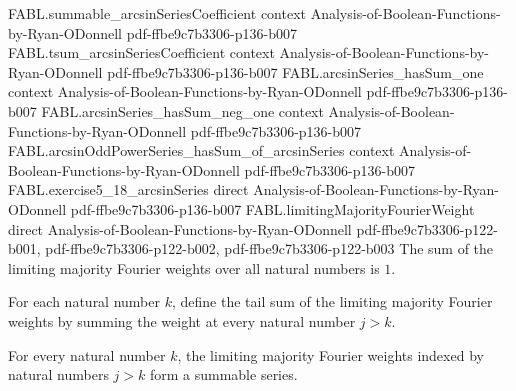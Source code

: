 \begin{theorem}
  {FABL.summable_arcsinSeriesCoefficient}
  {context}
  {Analysis-of-Boolean-Functions-by-Ryan-ODonnell}
  {pdf-ffbe9c7b3306-p136-b007}
\proofstep
  {FABL.tsum_arcsinSeriesCoefficient}
  {context}
  {Analysis-of-Boolean-Functions-by-Ryan-ODonnell}
  {pdf-ffbe9c7b3306-p136-b007}
\proofstep
  {FABL.arcsinSeries_hasSum_one}
  {context}
  {Analysis-of-Boolean-Functions-by-Ryan-ODonnell}
  {pdf-ffbe9c7b3306-p136-b007}
\proofstep
  {FABL.arcsinSeries_hasSum_neg_one}
  {context}
  {Analysis-of-Boolean-Functions-by-Ryan-ODonnell}
  {pdf-ffbe9c7b3306-p136-b007}
\proofstep
  {FABL.arcsinOddPowerSeries_hasSum_of_arcsinSeries}
  {context}
  {Analysis-of-Boolean-Functions-by-Ryan-ODonnell}
  {pdf-ffbe9c7b3306-p136-b007}
\proofstep
  {FABL.exercise5_18_arcsinSeries}
  {direct}
  {Analysis-of-Boolean-Functions-by-Ryan-ODonnell}
  {pdf-ffbe9c7b3306-p136-b007}
\proofstep
  {FABL.limitingMajorityFourierWeight}
  {direct}
  {Analysis-of-Boolean-Functions-by-Ryan-ODonnell}
  {pdf-ffbe9c7b3306-p122-b001,
    pdf-ffbe9c7b3306-p122-b002,
    pdf-ffbe9c7b3306-p122-b003}
The sum of the limiting majority Fourier weights over all natural numbers is $1$.
\end{theorem}

\begin{definition}
\label{FABL.limitingMajorityFourierWeightAbove}
\leanok
{}
For each natural number $k$, define the tail sum of the limiting majority Fourier
weights by summing the weight at every natural number $j>k$.
\end{definition}

\begin{theorem}
\label{FABL.limitingMajorityFourierWeightAbove_summable}
\leanok
{}
For every natural number $k$, the limiting majority Fourier weights indexed by natural
numbers $j>k$ form a summable series.
\end{theorem}
